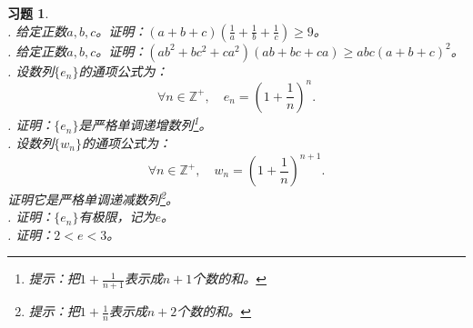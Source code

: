\documentclass[12pt,UTF8]{ctexbook}
\newtheorem{xt}{习题}[section]
\begin{document}
\begin{xt}    
    \mbox{}\\
    . 给定正数$a,b,c$。证明：$(a + b + c)(\frac{1}{a}+\frac{1}{b}+\frac{1}{c}) \geqslant 9$。\\
    . 给定正数$a,b,c$。证明：$(ab^2 + bc^2 + ca^2)(ab + bc + ca) \geqslant abc(a+b+c)^2$。 \\
    . 设数列$\{e_n\}$的通项公式为：
    $$ \forall n\in\mathbb{Z}^+,\quad e_n = \left(1 + \frac{1}{n}\right)^n.$$
    . 证明：$\{e_n\}$是严格单调递增数列\footnote{提示：把$1 + \frac{1}{n+1}$表示成$n+1$个数的和。}。\\
    . 设数列$\{w_n\}$的通项公式为：
    $$ \forall n\in\mathbb{Z}^+,\quad w_n = \left(1 + \frac{1}{n}\right)^{n+1}.$$
    证明它是严格单调递减数列\footnote{提示：把$1 + \frac{1}{n}$表示成$n+2$个数的和。}。 \\
    . 证明：$\{e_n\}$有极限，记为$e$。\\
    . 证明：$2 < e < 3$。
\end{xt}
\end{document}
